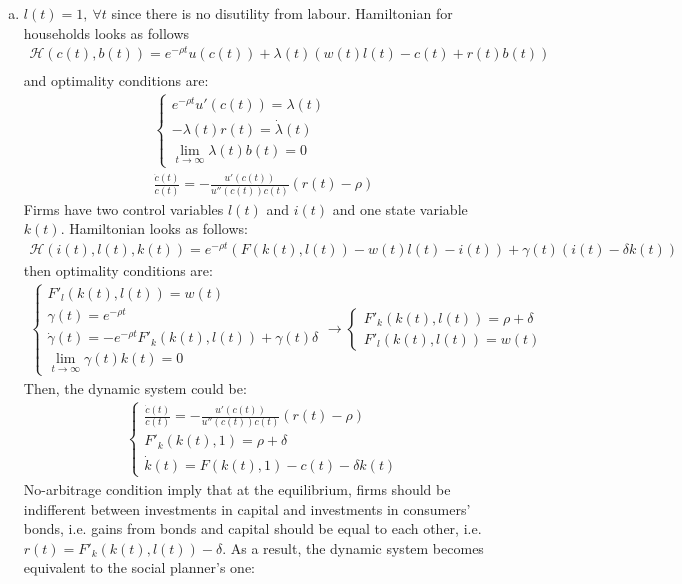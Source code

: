 \documentclass[a4paper]{article}
\begin{document}
\begin{enumerate}[1.]
\begin{enumerate}[(a)]
	\item $l(t) = 1,\ \forall t$ since there is no disutility from labour. Hamiltonian for households looks as follows
	\begin{align*}
	\mathscr{H}(c(t), b(t)) = e^{-\rho t}u(c(t)) + \lambda(t)(w(t)l(t) - c(t) + r(t)b(t))\\
	\end{align*}
	and optimality conditions are:
	\begin{align*}
	\begin{cases}
	e^{-\rho t}u'(c(t)) = \lambda(t)\\
	-\lambda(t)r(t) = \dot{\lambda}(t)\\
	\lim_{t \to \infty} \lambda(t)b(t) = 0
	\end{cases}\\
	\frac{\dot{c}(t)}{c(t)} = -\frac{u'(c(t))}{u''(c(t))c(t)}(r(t) - \rho)
	\end{align*}
	Firms have two control variables $l(t)$ and $i(t)$ and one state variable $k(t)$. Hamiltonian looks as follows:
	\begin{align*}
	\mathscr{H}(i(t), l(t), k(t)) = e^{-\rho t}(F(k(t), l(t)) - w(t)l(t) - i(t)) + \gamma(t)(i(t) - \delta k(t))
	\end{align*}
	then optimality conditions are:
	\begin{align*}
	\begin{cases}
	F'_l(k(t), l(t)) = w(t)\\
	\gamma(t) = e^{-\rho t}\\
	\dot{\gamma}(t) = -e^{-\rho t}F'_k(k(t), l(t)) + \gamma(t)\delta\\
	\lim_{t \to \infty} \gamma(t) k(t) = 0
	\end{cases} \to \begin{cases}
	F'_k(k(t), l(t)) = \rho + \delta\\
	F'_l(k(t), l(t)) = w(t)
	\end{cases}
	\end{align*}
	Then, the dynamic system could be:
	\begin{align*}
	\begin{cases}
	\frac{\dot{c}(t)}{c(t)} = -\frac{u'(c(t))}{u''(c(t))c(t)}(r(t) - \rho)\\
	F'_k(k(t), 1) = \rho + \delta\\
	\dot{k}(t) = F(k(t), 1) - c(t) - \delta k(t)
	\end{cases}
	\end{align*}
	No-arbitrage condition imply that at the equilibrium, firms should be indifferent between investments in capital and investments in consumers' bonds, i.e. gains from bonds and capital should be equal to each other, i.e. $r(t) = F'_k(k(t), l(t)) - \delta$. As a result, the dynamic system becomes equivalent to the social planner's one:

\end{enumerate}
\end{enumerate}
\end{document}
